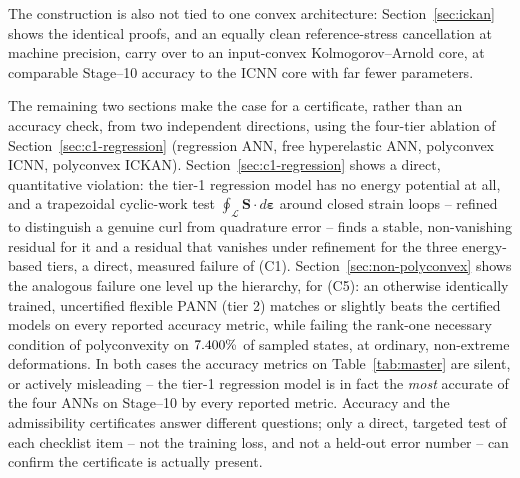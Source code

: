 \documentclass[10pt,a4paper]{article}
\begin{document}
The construction is also not tied to one convex architecture:
Section~\ref{sec:ickan} shows the identical proofs, and an equally clean
reference-stress cancellation at machine precision, carry over to an
input-convex Kolmogorov--Arnold core, at comparable Stage--10 accuracy to
the ICNN core with far fewer parameters.

The remaining two sections make the case for a certificate, rather than
an accuracy check, from two independent directions, using the four-tier
ablation of Section~\ref{sec:c1-regression} (regression ANN, free
hyperelastic ANN, polyconvex ICNN, polyconvex ICKAN). Section~\ref{sec:c1-regression}
shows a direct, quantitative violation: the tier-1 regression model has
no energy potential at all, and a trapezoidal cyclic-work test
$\oint_{\mathcal L}\bm S\cdot d\bm\varepsilon$ around closed strain loops
-- refined to distinguish a genuine curl from quadrature error -- finds a
stable, non-vanishing residual for it and a residual that vanishes under
refinement for the three energy-based tiers, a direct, measured failure
of (C1). Section~\ref{sec:non-polyconvex} shows the analogous failure one
level up the hierarchy, for (C5): an otherwise identically trained,
uncertified flexible PANN (tier 2) matches or slightly beats the
certified models on every reported accuracy metric, while failing the
rank-one necessary condition of polyconvexity on
$7.400\%$ of sampled states, at ordinary,
non-extreme deformations. In both cases the accuracy metrics on
Table~\ref{tab:master} are silent, or actively misleading -- the tier-1
regression model is in fact the \emph{most} accurate of the four ANNs on
Stage--10 by every reported metric. Accuracy and the admissibility
certificates answer different questions; only a direct, targeted test of
each checklist item -- not the training loss, and not a held-out error
number -- can confirm the certificate is actually present.
\end{document}
